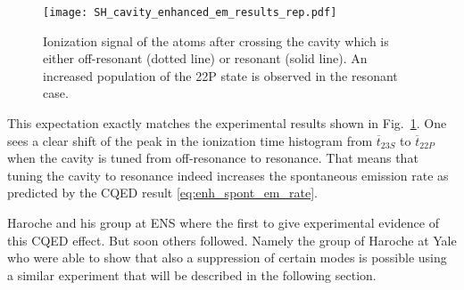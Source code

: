 \begin{figure}[t]
  \centering
  \texttt{[image: SH\_cavity\_enhanced\_em\_results\_rep.pdf]}
  \caption{Ionization signal of the atoms after crossing the cavity which is either
  off-resonant (dotted line) or resonant (solid line). An increased population
of the 22P state is observed in the resonant case.}
  \label{fig:SH_cavity_enhanced_em_results_rep}
\end{figure}
This expectation exactly matches the experimental results shown in
Fig.~\ref{fig:SH_cavity_enhanced_em_results_rep}. One sees a clear shift of the
peak in the ionization time histogram from $\overline{t}_{23S}$ to
$\overline{t}_{22P}$ when the cavity is tuned from off-resonance to resonance.
That means that tuning the cavity to resonance indeed increases the spontaneous
emission rate as predicted by the CQED result \eqref{eq:enh_spont_em_rate}.


Haroche and his group at ENS where the first to give experimental evidence of
this CQED effect. But soon others followed. Namely the group of Haroche at Yale
who were able to show that also a suppression of certain modes is possible
using a similar experiment that will be described in the following section.

